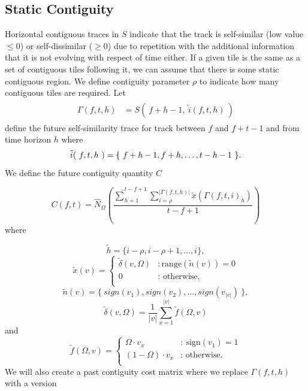 \documentclass[twocolumn]{article}
\begin{document}
	\subsection{Static Contiguity}
	
	Horizontal contiguous traces in $S$ indicate that the track is self-similar (low value $\le 0$) or self-dissimilar ($\ge 0$) due to repetition with the additional information that it is not evolving with respect of time either. If a given tile is the same as a set of contiguous tiles following it, we can assume that there is some static contiguous region. We define contiguity parameter $\rho$ to indicate how many contiguous tiles are required. Let 
\begin{align*}
\begin{array}{ll}
\Gamma( f,t,h ) &= S(~ f + h - 1,~ \tilde{i}(f, t, h) ~)
\end{array}
\end{align*} define the future self-similarity trace for track between $f$ and $f+t-1$ and from time horizon $h$ where 
\begin{dmath*}
\tilde{i}(~f,t,h~) =\\ \{~ f + h - 1, f + h, \ldots, t-h-1 ~ \}.
\end{dmath*}
We define the future contiguity quantity $C$
	
\begin{dmath*}  C(f, t)  =  
\hat N_\Omega \left( \frac{ \tilde	\sum_{h=1}^{t-f+1} 
	\sum_{i=\rho}^{|\Gamma( f,t,h )|} \tilde{x}\left( \Gamma( f,t,i )_{\tilde{h}} \right) }{t-f+1}  \right)
\end{dmath*}  where  

\begin{dmath*}
\tilde{h} = \{i-\rho,i-\rho+1, \ldots,i \},
\end{dmath*}
\begin{dmath*}
\tilde{x}(v) = { \left\{ 
	\begin{array}{lr}
		  \tilde \delta( v, \Omega ) & : \mathrm{range}( \tilde{n}(v) ) = 0  \\
		0 & : \mbox{~otherwise,} \\
	\end{array}
	\right.}
\end{dmath*}
\begin{dmath*}
	\tilde{n}(v) = \{~ sign(v_1), sign(v_2),\ldots, sign(v_{|v|}) ~\},
\end{dmath*}
\begin{dmath*}\tilde \delta( v, \Omega ) = \frac{1}{|v|} \sum^{|v|}_{x=1}
		\tilde{f}(\Omega, v) 
\end{dmath*}	
	and
	\begin{dmath*}
	\tilde{f}(\Omega, v) = \left\{ 
	\begin{array}{lr}
		\Omega \cdot v_x &:  ~\mathrm{sign}(v_1)=1 \\
		(1-\Omega) \cdot v_x &: \mbox{~otherwise.}    \\
	\end{array}
	\right.
\end{dmath*}
	We will also create a past contiguity cost matrix where we replace $\Gamma( f,t,h )$ with a version 
\end{document}
